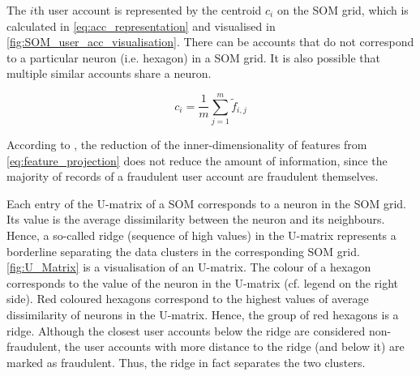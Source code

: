 The $i$th user account is represented by the centroid $c_i$ on the \ac{SOM} grid, which is calculated in \eqref{eq:acc_representation} and visualised in \autoref{fig:SOM_user_acc_visualisation}.
There can be accounts that do not correspond to a particular neuron (i.e. hexagon) in a \ac{SOM} grid. 
It is also possible that multiple similar accounts share a neuron.
%
\begin{ceqn}
    \begin{equation}
    \label{eq:acc_representation}
        c_i = \frac{1}{m}\sum^{m}_{j=1} \tilde f_{i,j}
    \end{equation}
\end{ceqn}
%
According to \cite{fd_SOM}, the reduction of the inner-dimensionality of features from \eqref{eq:feature_projection} does not reduce the amount of information, since the majority of records of a fraudulent user account are fraudulent themselves.

Each entry of the U-matrix of a \ac{SOM} corresponds to a neuron in the \ac{SOM} grid. Its value is the average dissimilarity between the neuron and its neighbours.
Hence, a so-called ridge (sequence of high values) in the U-matrix represents a borderline separating the data clusters in the corresponding \ac{SOM} grid.
\autoref{fig:U_Matrix} is a visualisation of an U-matrix. The colour of a hexagon corresponds to the value of the neuron in the U-matrix (cf. legend on the right side). 
Red coloured hexagons correspond to the highest values of average dissimilarity of neurons in the U-matrix. Hence, the group of red hexagons is a ridge. 
Although the closest user accounts below the ridge are considered non-fraudulent, the user accounts with more distance to the ridge (and below it) are marked as fraudulent. 
Thus, the ridge in fact separates the two clusters.

